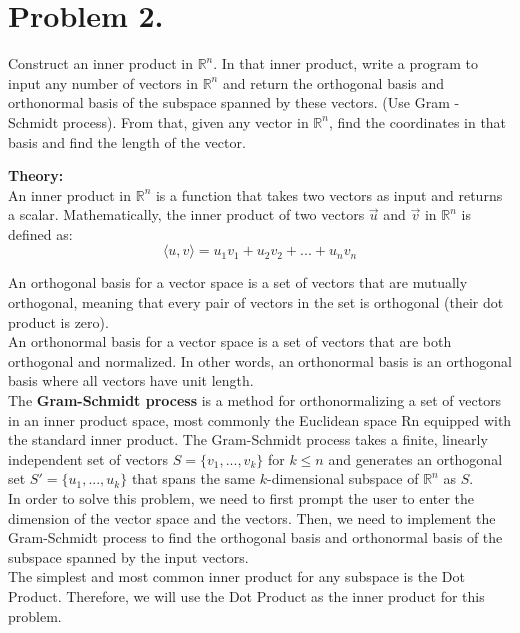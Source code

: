 \clearpage
\section{ Problem 2.}
Construct an inner product in $\mathbb{R}^n$. 
In that inner product, write a program to input any number of vectors in $\mathbb{R}^n$ and return the orthogonal
basis and orthonormal basis of the subspace spanned by these vectors. (Use Gram - Schmidt process). From that, given any vector in $\mathbb{R}^n$, find the coordinates in that basis and find the length of the vector.

\vspace*{1cm}

\textbf{Theory:}\\[6pt]
An inner product in $ \mathbb{R}^n $ is a function that takes two vectors as input and returns a scalar. Mathematically, the inner product of two vectors $ \vec{u} $ and $ \vec{v} $ in $ \mathbb{R}^n $ is defined as:
$$ \langle u, v \rangle = u_1v_1 + u_2v_2 + ... + u_nv_n $$

An orthogonal basis for a vector space is a set of vectors that are mutually orthogonal, meaning that every pair of vectors in the set is orthogonal (their dot product is zero). \\[6pt]
An orthonormal basis for a vector space is a set of vectors that are both orthogonal and normalized. In other words, an orthonormal basis is an orthogonal basis where all vectors have unit length. \\[6pt]
The \textbf{Gram-Schmidt process} is a method for orthonormalizing a set of vectors in an inner product space, most commonly the Euclidean space Rn equipped with the standard inner product. The Gram-Schmidt process takes a finite, linearly independent set of vectors $S = \{v_1, ..., v_k\}$ for $ k \leq n$ and generates an orthogonal set $S' = \{u_1, ..., u_k\}$ that spans the same $k$-dimensional subspace of $\mathbb{R}^n$ as $S$.\\[6pt]

In order to solve this problem, we need to first prompt the user to enter the dimension of the vector space and the vectors. Then, we need to implement the Gram-Schmidt process to find the orthogonal basis and orthonormal basis of the subspace spanned by the input vectors.\\[6pt]
The simplest and most common inner product for any subspace is the Dot Product. Therefore, we will use the Dot Product as the inner product for this problem.

